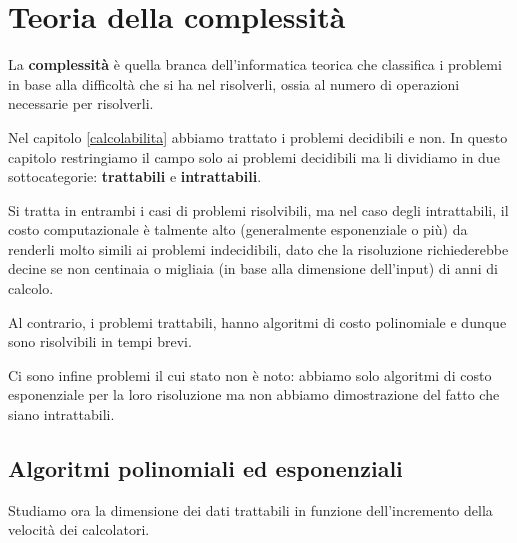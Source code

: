 \chapter{Teoria della complessit\`a}\label{complessita}
La \textbf{complessit\`a} \`e quella branca dell'informatica teorica che classifica i problemi in base alla
difficolt\`a che si ha nel risolverli, ossia al numero di operazioni necessarie per risolverli.

Nel capitolo \ref{calcolabilita} abbiamo trattato i problemi decidibili e non. In questo capitolo restringiamo il
campo solo ai problemi decidibili ma li dividiamo in due sottocategorie: \textbf{trattabili} e \textbf{intrattabili}.

Si tratta in entrambi i casi di problemi risolvibili, ma nel caso degli intrattabili, il costo computazionale \`e
talmente alto (generalmente esponenziale o pi\`u) da renderli molto simili ai problemi indecidibili, dato che
la risoluzione richiederebbe decine se non centinaia o migliaia (in base alla dimensione dell'input) di anni di
calcolo.

Al contrario, i problemi trattabili, hanno algoritmi di costo polinomiale e dunque sono risolvibili in tempi brevi.

Ci sono infine problemi il cui stato non \`e noto: abbiamo solo algoritmi di costo esponenziale per la loro
risoluzione ma non abbiamo dimostrazione del fatto che siano intrattabili.

\section{Algoritmi polinomiali ed esponenziali}\label{alg_poly_exp}
Studiamo ora la dimensione dei dati trattabili in funzione dell'incremento della velocit\`a dei calcolatori.

